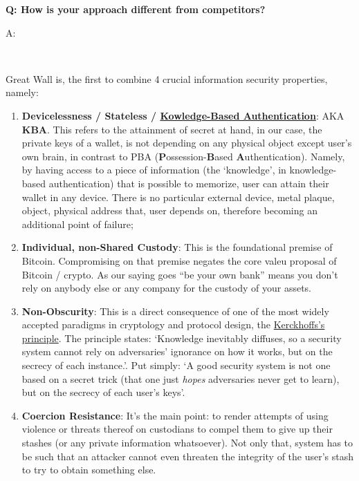 \documentclass[12pt,a4paper]{article}
\newenvironment{question}[1]{%
  \vspace{0.8em}\noindent\textbf{Q: #1}\par
  \vspace{0.2em}\noindent\begin{itshape}A:\end{itshape}~%
}{\vspace{0.8em}}
\begin{document}
\begin{question}{How is your approach different from competitors?}
Great Wall is, the first to combine 4 crucial information security properties, namely:
  \begin{enumerate}
    \item \textbf{Devicelessness / Stateless / \href{https://en.wikipedia.org/wiki/Knowledge-based_authentication}{Kowledge-Based Authentication}}: AKA \textbf{KBA}. This refers to the attainment of secret at hand, in our case, the private keys of a wallet, is not depending on any physical object except user's own brain, in contrast to PBA (\textbf{P}ossession-\textbf{B}ased \textbf{A}uthentication). Namely, by having access to a piece of information (the `knowledge', in knowledge-based authentication) that is possible to memorize, user can attain their wallet in any device. There is no particular external device, metal plaque, object, physical address that, user depends on, therefore becoming an additional point of failure;
    \item \textbf{Individual, non-Shared Custody}: This is the foundational premise of Bitcoin. Compromising on that premise negates the core valeu proposal of Bitcoin / crypto. As our saying goes ``be your own bank'' means you don't rely on anybody else or any company for the custody of your assets.
    \item \textbf{Non-Obscurity}: This is a direct consequence of one of the most widely accepted paradigms in cryptology and protocol design, the \href{https://en.wikipedia.org/wiki/Kerckhoffs's_principle}{Kerckhoffs's principle}. The principle states: `Knowledge inevitably diffuses, so a security system cannot rely on adversaries' ignorance on how it works, but on the secrecy of each instance.'. Put simply: `A good security system is not one based on a secret trick (that one just \textit{hopes} adversaries never get to learn), but on the secrecy of each user's keys'.
    \item \textbf{Coercion Resistance}: It's the main point: to render attempts of using violence or threats thereof on custodians to compel them to give up their stashes (or any private information whatsoever). Not only that, system has to be such that an attacker cannot even threaten the integrity of the user's stash to try to obtain something else.
  \end{enumerate}
\end{question}
\end{document}
